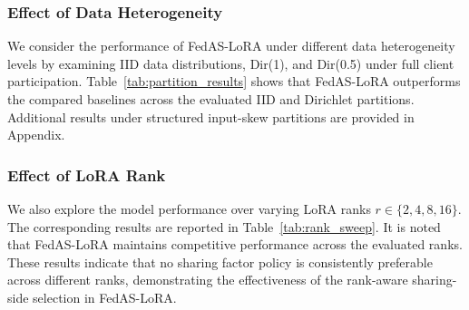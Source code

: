 \documentclass[lettersize,journal]{IEEEtran}
\begin{document}
\subsubsection{Effect of Data Heterogeneity}
\label{subsubsec:data_heterogeneity}
We consider the performance of FedAS-LoRA under different data heterogeneity levels by examining IID data distributions, Dir(1), and Dir(0.5) under full client participation.
 {\color{black}Table~\ref{tab:partition_results} shows that FedAS-LoRA outperforms the compared baselines across the evaluated IID and Dirichlet partitions. Additional results under structured input-skew partitions are provided in Appendix.}






\subsubsection{Effect of LoRA Rank}
\label{subsec:rank_awareness}
We also explore the model performance over varying LoRA ranks $r\in\{2,4,8,16\}$. The corresponding results are reported in Table~\ref{tab:rank_sweep}. It is noted that FedAS-LoRA maintains competitive performance across the evaluated ranks.  {\color{black}These results indicate that no sharing factor policy is consistently preferable across different ranks, demonstrating the effectiveness of the rank-aware sharing-side selection in FedAS-LoRA.} 
\end{document}
